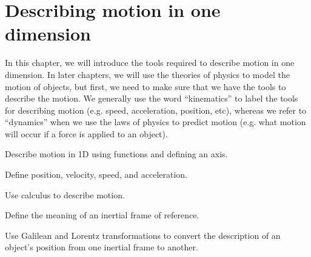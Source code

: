 %
\chapter{Describing motion in one dimension}
\label{Kinematics1D}
In this chapter, we will introduce the tools required to describe motion in one dimension. In later chapters, we will use the theories of physics to model the motion of objects, but first, we need to make sure that we have the tools to describe the motion. We generally use the word ``kinematics'' to label the tools for describing motion (e.g. speed, acceleration, position, etc), whereas we refer to ``dynamics'' when we use the laws of physics to predict motion (e.g. what motion will occur if a force is applied to an object). 

\begin{learningObjectives}
{\item Describe motion in 1D using functions and defining an axis.
\item Define position, velocity, speed, and acceleration.
\item Use calculus to describe motion.
\item Define the meaning of an inertial frame of reference.
\item Use Galilean and Lorentz transformations to convert the description of an object's position from one inertial frame to another.}
\end{learningObjectives}




